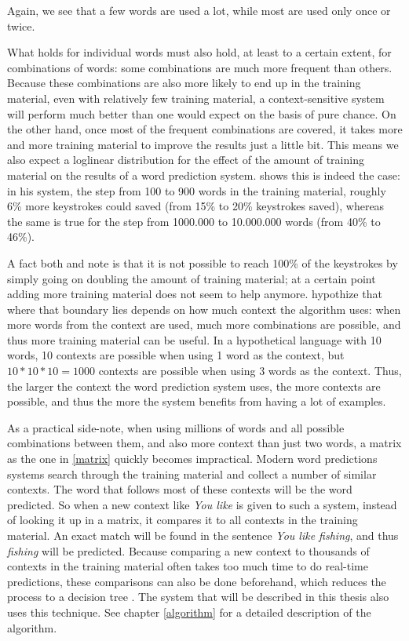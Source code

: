 \documentclass[12pt]{article}
\begin{document}
Again, we see that a few words are used a lot, while most are used only once or twice.

What holds for individual words must also hold, at least to a certain extent, for combinations of words: some combinations are much more frequent than others. Because these combinations are also more likely to end up in the training material, even with relatively few training material, a context-sensitive system will perform much better than one would expect on the basis of pure chance. On the other hand, once most of the frequent combinations are covered, it takes more and more training material to improve the results just a little bit. This means we also expect a loglinear distribution for the effect of the amount of training material on the results of a word prediction system.  shows this is indeed the case: in his system, the step from 100 to 900 words in the training material, roughly 6\% more keystrokes could saved (from 15\% to 20\% keystrokes saved), whereas the same is true for the step from 1000.000 to 10.000.000 words (from 40\% to 46\%).

A fact both  and  note is that it is not possible to reach 100\% of the keystrokes by simply going on doubling the amount of training material; at a certain point adding more training material does not seem to help anymore.  hypothize that where that boundary lies depends on how much context the algorithm uses: when more words from the context are used, much more combinations are possible, and thus more training material can be useful. In a hypothetical language with 10 words, 10 contexts are possible when using 1 word as the context, but $10*10*10 = 1000$ contexts are possible when using 3 words as the context. Thus, the larger the context the word prediction system uses, the more contexts are possible, and thus the more the system benefits from having a lot of examples.

As a practical side-note, when using millions of words and all possible combinations between them, and also more context than just two words, a matrix as the one in \ref{matrix} quickly becomes impractical. Modern word predictions systems search through the training material and collect a number of similar contexts. The word that follows most of these contexts will be the word predicted. So when a new context like \emph{You like} is given to such a system, instead of looking it up in a matrix, it compares it to all contexts in the training material. An exact match will be found in the sentence \emph{You like fishing}, and thus \emph{fishing} will be predicted. Because comparing a new context to thousands of contexts in the training material often takes too much time to do real-time predictions, these comparisons can also be done beforehand, which reduces the process to a decision tree . The system that will be described in this thesis also uses this technique. See chapter \ref{algorithm} for a detailed description of the algorithm.
\end{document}
